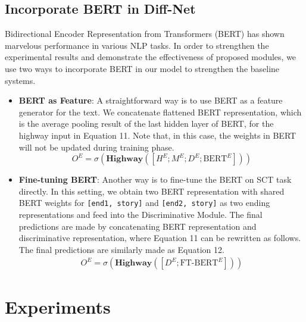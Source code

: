 \documentclass[letterpaper]{article} %
\begin{document}
\subsection{Incorporate BERT in Diff-Net}
Bidirectional Encoder Representation from Transformers (BERT) \cite{devlin2018bert} has shown marvelous performance in various NLP tasks.
In order to strengthen the experimental results and demonstrate the effectiveness of proposed modules, we use two ways to incorporate BERT in our model to strengthen the baseline systems.
\begin{itemize}[leftmargin=*]
\item {\bf BERT as Feature}: A straightforward way is to use BERT as a feature generator for the text. We concatenate flattened BERT representation, which is the average pooling result of the last hidden layer of BERT, for the highway input in Equation 11. Note that, in this case, the weights in BERT will not be updated during training phase.
\begin{equation}
O^E =  \sigma(\mathbf{Highway}([H^E; M^E; D^E; \text{BERT}^E]))
\end{equation}
\item {\bf Fine-tuning BERT}: Another way is to fine-tune the BERT on SCT task directly. In this setting, we obtain two BERT representation with shared BERT weights for {\tt[end1, story]} and {\tt[end2, story]} as two ending representations and feed into the Discriminative Module. The final predictions are made by concatenating BERT representation and discriminative representation, where Equation 11 can be rewritten as follows.
The final predictions are similarly made as Equation 12.
\begin{gather}
O^E =  \sigma(\mathbf{Highway}([D^E; \text{FT-BERT}^E]))
\end{gather}
\end{itemize}


\section{Experiments}\label{experiments}
\end{document}
